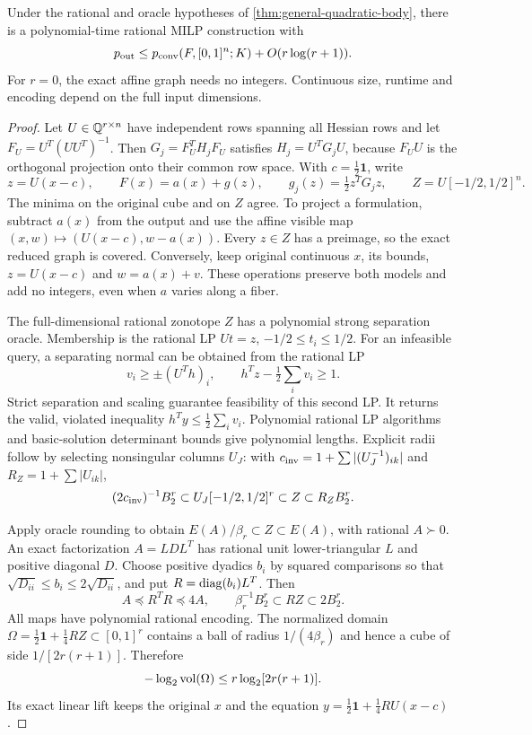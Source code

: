 \begin{theorem}\label{thm:input-quotient}
Under the rational and oracle hypotheses of
\cref{thm:general-quadratic-body}, there is a polynomial-time rational
MILP construction with
\begin{equation}\label{eq:input-rank-count}
 p_{\rm out}\le p_{\mathrm{conv}}(F,[0,1]^n;K)+O(r\log(r+1)).
\end{equation}
For $r=0$, the exact affine graph needs no integers. Continuous size,
runtime and encoding depend on the full input dimensions.
\end{theorem}
\begin{proof}
Let $U\in\mathbb Q^{r\times n}$ have independent rows spanning all Hessian
rows and let $F_U=U^T(UU^T)^{-1}$. Then
$G_j=F_U^TH_jF_U$ satisfies $H_j=U^TG_jU$, because $F_UU$ is the
orthogonal projection onto their common row space. With
$c=\frac12\mathbf1$, write
\[
 z=U(x-c),\qquad F(x)=a(x)+g(z),\qquad
 g_j(z)=\tfrac12z^TG_jz,\qquad Z=U[-1/2,1/2]^n.
\]
The minima on the original cube and on $Z$ agree. To project a formulation,
subtract $a(x)$ from the output and use the affine visible map
$(x,w)\mapsto(U(x-c),w-a(x))$. Every $z\in Z$ has a preimage, so the
exact reduced graph is covered. Conversely, keep original continuous
$x$, its bounds, $z=U(x-c)$ and $w=a(x)+v$. These operations preserve
both models and add no integers, even when $a$ varies along a fiber.

The full-dimensional rational zonotope $Z$ has a polynomial strong
separation oracle. Membership is the rational LP
$Ut=z$, $-1/2\le t_i\le1/2$. For an infeasible query, a separating
normal can be obtained from the rational LP
\[
 v_i\ge\pm(U^Th)_i,\qquad h^Tz-\tfrac12\sum_i v_i\ge1.
\]
Strict separation and scaling guarantee feasibility of this second LP.
It returns the valid, violated inequality
$h^Ty\le\frac12\sum_i v_i$. Polynomial rational LP algorithms and
basic-solution determinant bounds give polynomial lengths. Explicit
radii follow by selecting nonsingular columns $U_J$: with
$c_{\rm inv}=1+\sum|(U_J^{-1})_{ik}|$ and
$R_Z=1+\sum|U_{ik}|$,
\[
 (2c_{\rm inv})^{-1}B_2^r\subset U_J[-1/2,1/2]^r
                 \subset Z\subset R_ZB_2^r.
\]

Apply oracle rounding to obtain $E(A)/\beta_r\subset Z\subset E(A)$,
with rational $A\succ0$. An exact factorization $A=LDL^T$ has rational
unit lower-triangular $L$ and positive diagonal $D$. Choose positive
dyadics $b_i$ by squared comparisons so that
$\sqrt{D_{ii}}\le b_i\le2\sqrt{D_{ii}}$, and put
$R=\operatorname{diag}(b_i)L^T$. Then
\[
 A\preceq R^TR\preceq4A,\qquad
 \beta_r^{-1}B_2^r\subset RZ\subset2B_2^r.
\]
All maps have polynomial rational encoding. The normalized domain
$\Omega=\frac12\mathbf1+\frac14RZ\subset[0,1]^r$ contains a ball of
radius $1/(4\beta_r)$ and hence a cube of side $1/[2r(r+1)]$. Therefore
\begin{equation}\label{eq:quotient-domain-volume}
 -\log_2\operatorname{vol}(\Omega)\le r\log_2[2r(r+1)].
\end{equation}
Its exact linear lift keeps the original $x$ and the equation
$y=\frac12\mathbf1+\frac14RU(x-c)$.


\end{proof}
